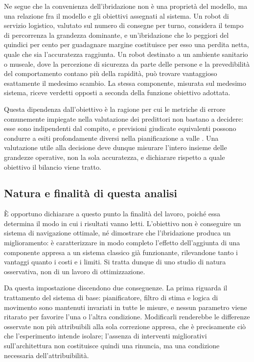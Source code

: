 Ne segue che la convenienza dell'ibridazione non è una proprietà del modello, ma una
relazione fra il modello e gli obiettivi assegnati al sistema. Un robot di servizio
logistico, valutato sul numero di consegne per turno, considera il tempo di percorrenza la
grandezza dominante, e un'ibridazione che lo peggiori del quindici per cento per guadagnare
margine costituisce per esso una perdita netta, quale che sia l'accuratezza raggiunta. Un
robot destinato a un ambiente sanitario o museale, dove la percezione di sicurezza da
parte delle persone e la prevedibilità del comportamento contano più della rapidità, può
trovare vantaggioso esattamente il medesimo scambio. La stessa componente, misurata sul
medesimo sistema, riceve verdetti opposti a seconda della funzione obiettivo adottata.

Questa dipendenza dall'obiettivo è la ragione per cui le metriche di errore comunemente
impiegate nella valutazione dei predittori non bastano a decidere: esse sono indipendenti
dal compito, e previsioni giudicate equivalenti possono condurre a esiti profondamente
diversi nella pianificazione a valle \cite{ivanovic2021rethinking, ivanovic2022injecting}.
Una valutazione utile alla decisione deve dunque misurare l'intero insieme delle grandezze
operative, non la sola accuratezza, e dichiarare rispetto a quale obiettivo il bilancio
viene tratto.


\subsection{Natura e finalità di questa analisi}

È opportuno dichiarare a questo punto la finalità del lavoro, poiché essa determina il
modo in cui i risultati vanno letti. L'obiettivo non è conseguire un sistema di navigazione
ottimale, né dimostrare che l'ibridazione produca un miglioramento: è caratterizzare in
modo completo l'effetto dell'aggiunta di una componente appresa a un sistema classico già
funzionante, rilevandone tanto i vantaggi quanto i costi e i limiti. Si tratta dunque di
uno studio di natura osservativa, non di un lavoro di ottimizzazione.

Da questa impostazione discendono due conseguenze. La prima riguarda il trattamento del
sistema di base: pianificatore, filtro di stima e logica di movimento sono mantenuti
invariati in tutte le misure, e nessun parametro viene ritarato per favorire l'una o
l'altra condizione. Modificarli renderebbe le differenze osservate non più attribuibili
alla sola correzione appresa, che è precisamente ciò che l'esperimento intende isolare;
l'assenza di interventi migliorativi sull'architettura non costituisce quindi una rinuncia,
ma una condizione necessaria dell'attribuibilità.

